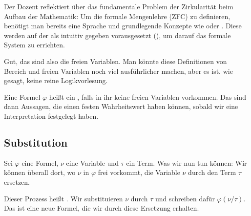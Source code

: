 \begin{didactic-insight}
Der Dozent reflektiert über das fundamentale Problem der Zirkularität beim Aufbau der Mathematik: Um die formale Mengenlehre (ZFC) zu definieren, benötigt man bereits eine Sprache und grundlegende Konzepte wie  oder . Diese werden auf der  als intuitiv gegeben vorausgesetzt (), um darauf das formale System zu errichten.
\end{didactic-insight}

\begin{spoken-clean}[01:11:27 - 01:13:27]
Gut, das sind also die freien Variablen. Man könnte diese Definitionen von Bereich und freien Variablen noch viel ausführlicher machen, aber es ist, wie gesagt, keine reine Logikvorlesung.

Eine Formel $\varphi$ heißt ein , falls in ihr keine freien Variablen vorkommen.  Das sind dann Aussagen, die einen festen Wahrheitswert haben können, sobald wir eine Interpretation festgelegt haben.
\end{spoken-clean}

\begin{math-stroke}
\end{math-stroke}

\subsection{Substitution}

\begin{spoken-clean}[01:13:27 - 01:16:27]
Sei $\varphi$ eine Formel, $\nu$ eine Variable und $\tau$ ein Term. Was wir nun tun können: Wir können überall dort, wo $\nu$ in $\varphi$ frei vorkommt, die Variable $\nu$ durch den Term $\tau$ ersetzen. 

Dieser Prozess heißt . Wir substituieren $\nu$ durch $\tau$ und schreiben dafür $\varphi(\nu/\tau)$. Das ist eine neue Formel, die wir durch diese Ersetzung erhalten.
\end{spoken-clean}

